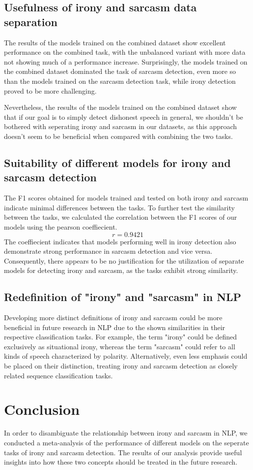\documentclass[10pt, a4paper]{article}
\begin{document}
\subsection{Usefulness of irony and sarcasm data separation}
The results of the models trained on the combined dataset show excellent performance on the combined task, with the unbalanced 
variant with more data not showing much of a performance increase. Surprisingly, the models trained on the combined dataset dominated
the task of sarcasm detection, even more so than the models trained on the sarcasm detection task, while irony detection proved to be more
challenging.

Nevertheless, the results of the models trained on the combined dataset show that if our goal is to simply detect dishonest speech in
general, we shouldn't be bothered with seperating irony and sarcasm in our datasets, as this approach doesn't seem to be beneficial
when compared with combining the two tasks.

\subsection{Suitability of different models for irony and sarcasm detection}
The F1 scores obtained for models trained and tested on both irony and sarcasm indicate minimal differences between the tasks.
To further test the similarity between the tasks, we calculated the correlation between the F1 scores of our models using the pearson coeffiecient.
$$
r = 0.9421
$$
The coeffiecient indicates that models performing well in irony detection also demonstrate strong performance in sarcasm detection and vice versa. 
Consequently, there appears to be no justification for the utilization of separate models for detecting irony and sarcasm, as the tasks exhibit strong
similarity.
\subsection{Redefinition of "irony" and "sarcasm" in NLP}
Developing more distinct definitions of irony and sarcasm could be more beneficial in future research in NLP due to the shown 
similarities in their respective classification tasks. For example, the term "irony" could be 
defined exclusively as situational irony, whereas the term "sarcasm" could refer to all kinds of speech characterized by polarity.
Alternatively, even less emphasis could be placed on their distinction, treating irony and sarcasm detection
as closely related sequence classification tasks.
\section{Conclusion}
In order to disambiguate the relationship between irony and sarcasm in NLP, we conducted a meta-analysis of the performance of different models on the 
seperate tasks of irony and sarcasm detection. The results of our analysis provide useful insights into how these two concepts should be treated in the
future research.
\end{document}
